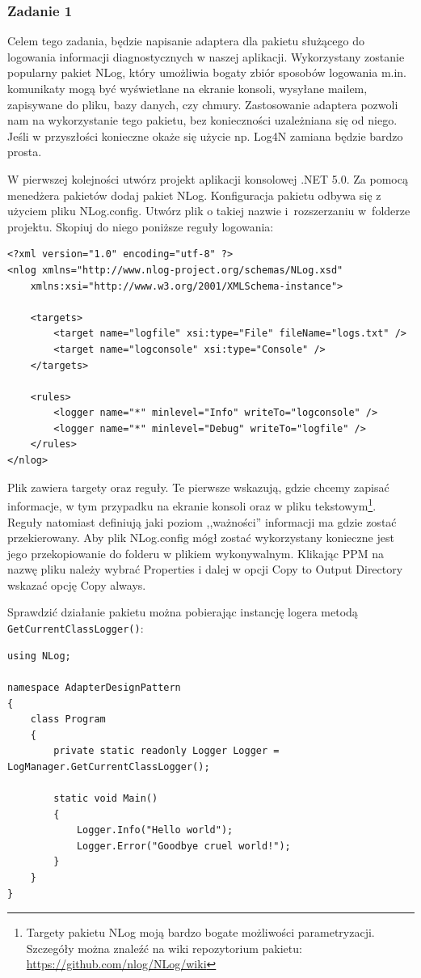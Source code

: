 \subsubsection{Zadanie 1}
Celem tego zadania, będzie napisanie adaptera dla pakietu służącego do logowania informacji diagnostycznych w naszej aplikacji. Wykorzystany zostanie popularny pakiet NLog, który umożliwia bogaty zbiór sposobów logowania m.in. komunikaty mogą być wyświetlane na ekranie konsoli, wysyłane mailem, zapisywane do pliku, bazy danych, czy chmury. Zastosowanie adaptera pozwoli nam na wykorzystanie tego pakietu, bez konieczności uzależniana się od niego. Jeśli w przyszłości konieczne okaże się użycie np. Log4N zamiana będzie bardzo prosta.  

W pierwszej kolejności utwórz projekt aplikacji konsolowej .NET 5.0. Za pomocą menedżera pakietów dodaj pakiet NLog. Konfiguracja pakietu odbywa się z użyciem pliku NLog.config. Utwórz plik o takiej nazwie i~rozszerzaniu w~folderze projektu. Skopiuj do niego poniższe reguły logowania:
\begin{lstlisting}[caption={Konfiguracja pakietu NLog}, label={lab3/lst/nlogConfig}]
<?xml version="1.0" encoding="utf-8" ?>
<nlog xmlns="http://www.nlog-project.org/schemas/NLog.xsd"
	xmlns:xsi="http://www.w3.org/2001/XMLSchema-instance">

	<targets>
		<target name="logfile" xsi:type="File" fileName="logs.txt" />
		<target name="logconsole" xsi:type="Console" />
	</targets>

	<rules>
		<logger name="*" minlevel="Info" writeTo="logconsole" />
		<logger name="*" minlevel="Debug" writeTo="logfile" />
	</rules>
</nlog>
\end{lstlisting}
Plik zawiera targety oraz reguły. Te pierwsze wskazują, gdzie chcemy zapisać informacje, w tym przypadku na ekranie konsoli oraz w pliku tekstowym\footnote{Targety pakietu NLog moją bardzo bogate możliwości parametryzacji. Szczegóły można znaleźć na wiki repozytorium pakietu: \url{https://github.com/nlog/NLog/wiki}}. Reguły natomiast definiują jaki poziom ,,ważności'' informacji ma gdzie zostać przekierowany. Aby plik NLog.config mógł zostać wykorzystany konieczne jest jego przekopiowanie do folderu w plikiem wykonywalnym. Klikając PPM na nazwę pliku należy wybrać Properties i dalej w opcji Copy to Output Directory wskazać opcję Copy always.

Sprawdzić działanie pakietu można pobierając instancję logera metodą \texttt{GetCurrentClassLogger()}:
\begin{lstlisting}[caption={Wywołanie metod logujących pakietu NLog}, label={lab3/lst/nlogPackageTest}]
using NLog;

namespace AdapterDesignPattern
{
	class Program
	{
		private static readonly Logger Logger = LogManager.GetCurrentClassLogger();
		
		static void Main()
		{
			Logger.Info("Hello world");
			Logger.Error("Goodbye cruel world!");
		}
	}
}
\end{lstlisting}


